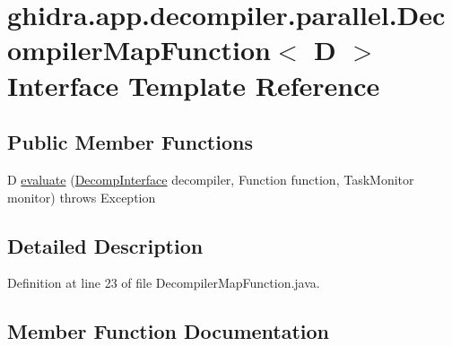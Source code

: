 \hypertarget{interfaceghidra_1_1app_1_1decompiler_1_1parallel_1_1_decompiler_map_function}{}\section{ghidra.\+app.\+decompiler.\+parallel.\+Decompiler\+Map\+Function$<$ D $>$ Interface Template Reference}
\label{interfaceghidra_1_1app_1_1decompiler_1_1parallel_1_1_decompiler_map_function}
\subsection*{Public Member Functions}
\begin{DoxyCompactItemize}
\item 
D \mbox{\hyperlink{interfaceghidra_1_1app_1_1decompiler_1_1parallel_1_1_decompiler_map_function_a3a13a154353f29e7a23a16830c783353}{evaluate}} (\mbox{\hyperlink{classghidra_1_1app_1_1decompiler_1_1_decomp_interface}{Decomp\+Interface}} decompiler, Function function, Task\+Monitor monitor)  throws Exception
\end{DoxyCompactItemize}


\subsection{Detailed Description}


Definition at line 23 of file Decompiler\+Map\+Function.\+java.



\subsection{Member Function Documentation}
\mbox{\label{interfaceghidra_1_1app_1_1decompiler_1_1parallel_1_1_decompiler_map_function_a3a13a154353f29e7a23a16830c783353}} 
